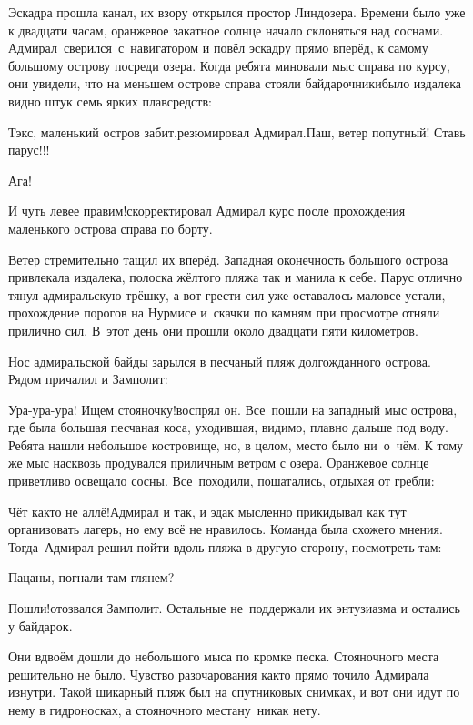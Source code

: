 Эскадра прошла канал, их взору открылся простор Линдозера. Времени было уже к двадцати часам, оранжевое закатное солнце начало склоняться над соснами. Адмирал~сверился~с~навигатором и повёл эскадру прямо вперёд, к самому большому острову посреди озера. Когда ребята миновали мыс справа по курсу, они увидели, что на меньшем острове справа стояли байдарочники\mdash было издалека видно штук семь ярких плавсредств:

\diagdash Тэк\sdash с, маленький остров забит.\mdash резюмировал Адмирал.\mdash Паш, ветер попутный! Ставь парус!!!

\diagdash Ага!

\diagdash И чуть левее правим!\mdash скорректировал Адмирал курс после прохождения маленького острова справа по борту.

Ветер стремительно тащил их вперёд. Западная оконечность большого острова привлекала издалека, полоска жёлтого пляжа так и манила к себе. Парус отлично тянул адмиральскую трёшку, а вот грести сил уже оставалось мало\mdash все устали, прохождение порогов на Нурмисе и~скачки по камням при просмотре отняли прилично сил. В~этот день они прошли около двадцати пяти километров.

Нос адмиральской байды зарылся в песчаный пляж долгожданного острова. Рядом причалил и Замполит:

\diagdash Ура-ура-ура! Ищем стояночку!\mdash воспрял он. Все~пошли на западный мыс острова, где была большая песчаная коса, уходившая, видимо, плавно дальше под воду. Ребята нашли небольшое костровище, но, в целом, место было ни~о~чём. К тому же мыс насквозь продувался приличным ветром с озера. Оранжевое солнце приветливо освещало сосны. Все~походили, пошатались, отдыхая от гребли:

\diagdash Чёт как\sdash то не аллё!\mdash Адмирал и так, и эдак мысленно прикидывал как тут организовать лагерь, но ему всё не нравилось. Команда была схожего мнения. Тогда~Адмирал решил пойти вдоль пляжа в другую сторону, посмотреть там:

\diagdash Пацаны, погнали там глянем?

\diagdash Пошли!\mdash отозвался Замполит. Остальные не~поддержали их энтузиазма и остались у байдарок.

Они вдвоём дошли до небольшого мыса по кромке песка. Стояночного места решительно не было. Чувство разочарования как\sdash то прямо точило Адмирала изнутри. Такой шикарный пляж был на спутниковых снимках, и вот они идут по нему в гидроносках, а стояночного места\mdash ну~никак нету.

